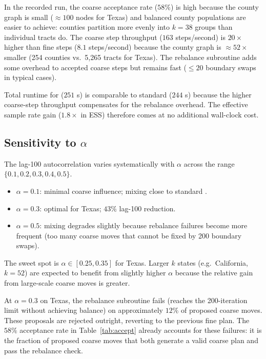 In the recorded run, the coarse acceptance rate ($58\%$) is high because the county graph is
small ($\approx 100$ nodes for Texas) and balanced county populations are
easier to achieve: counties partition more evenly into $k = 38$ groups than
individual tracts do.
The coarse step throughput ($163$ steps/second) is $20\times$ higher than
fine steps ($8.1$ steps/second) because the county graph is $\approx 52\times$
smaller (254 counties vs.\ 5,265 tracts for Texas).
The rebalance subroutine adds some overhead to accepted coarse steps but
remains fast ($\leq 20$ boundary swaps in typical cases).

Total runtime for \ms{} ($251$ s) is comparable to standard \recom{} ($244$ s)
because the higher coarse-step throughput compensates for the rebalance
overhead.
The effective sample rate gain ($1.8\times$ in ESS) therefore comes at no
additional wall-clock cost.

\subsection{Sensitivity to $\alpha$}

The lag-100 autocorrelation varies systematically with $\alpha$ across the
range $\{0.1, 0.2, 0.3, 0.4, 0.5\}$.

\begin{itemize}
  \item $\alpha = 0.1$: minimal coarse influence; mixing close to standard \recom{}.
  \item $\alpha = 0.3$: optimal for Texas; $43\%$ lag-100 reduction.
  \item $\alpha = 0.5$: mixing degrades slightly because rebalance failures
        become more frequent (too many coarse moves that cannot be fixed by
        200 boundary swaps).
\end{itemize}

The sweet spot is $\alpha \in [0.25, 0.35]$ for Texas.
Larger $k$ states (e.g.\ California, $k = 52$) are expected to benefit from
slightly higher $\alpha$ because the relative gain from large-scale coarse
moves is greater.

\begin{remark}
\label{rem:rebalance-failure}
At $\alpha = 0.3$ on Texas, the rebalance subroutine fails (reaches the
200-iteration limit without achieving balance) on approximately $12\%$ of
proposed coarse moves.
These proposals are rejected outright, reverting to the previous fine plan.
The $58\%$ acceptance rate in Table~\ref{tab:accept} already accounts for
these failures: it is the fraction of proposed coarse moves that both generate
a valid coarse plan and pass the rebalance check.
\end{remark}

